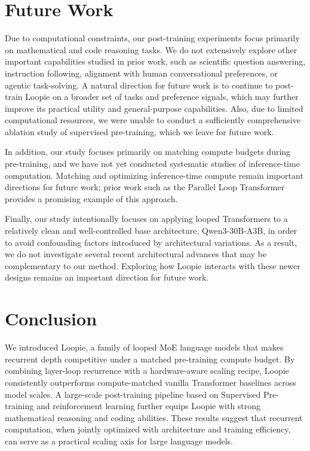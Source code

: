 \section{Future Work}
Due to computational constraints, our post-training experiments focus primarily on mathematical and code reasoning tasks. We do not extensively explore other important capabilities studied in prior work, such as scientific question answering, instruction following, alignment with human conversational preferences, or agentic task-solving. A natural direction for future work is to continue to post-train Loopie on a broader set of tasks and preference signals, which may further improve its practical utility and general-purpose capabilities. Also, due to limited computational resources, we were unable to conduct a sufficiently comprehensive ablation study of supervised pre-training, which we leave for future work.

In addition, our study focuses primarily on matching compute budgets during pre-training, and we have not yet conducted systematic studies of inference-time computation. Matching and optimizing inference-time compute remain important directions for future work; prior work such as the Parallel Loop Transformer~\citep{wu2025parallellooptransformerefficient} provides a promising example of this approach.

Finally, our study intentionally focuses on applying looped Transformers to a relatively clean and well-controlled base architecture, Qwen3-30B-A3B, in order to avoid confounding factors introduced by architectural variations. As a result, we do not investigate several recent architectural advances that may be complementary to our method. Exploring how Loopie interacts with these newer designs remains an important direction for future work.

\section{Conclusion}
We introduced Loopie, a family of looped MoE language models that makes recurrent depth competitive under a matched pre-training compute budget. By combining layer-loop recurrence with a hardware-aware scaling recipe, Loopie consistently outperforms compute-matched vanilla Transformer baselines across model scales. A large-scale post-training pipeline based on Supervised Pre-training and reinforcement learning further equips Loopie with strong mathematical reasoning and coding abilities. These results suggest that recurrent computation, when jointly optimized with architecture and training efficiency, can serve as a practical scaling axis for large language models.

